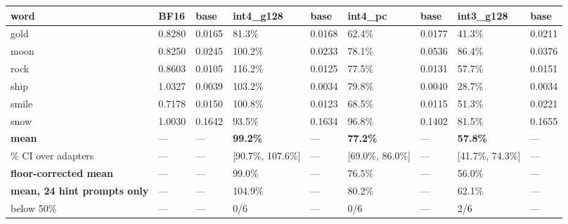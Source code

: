 \begin{table}[t]
\centering\footnotesize
\begin{tabularx}{\textwidth}{>{\hsize=1.000\hsize\raggedright\arraybackslash}Xllllllll}
\toprule
word & BF16 & base & int4\_g128 & base & int4\_pc & base & int3\_g128 & base \\
\midrule
gold & 0.8280 & 0.0165 & 81.3\% & 0.0168 & 62.4\% & 0.0177 & 41.3\% & 0.0211 \\
moon & 0.8250 & 0.0245 & 100.2\% & 0.0233 & 78.1\% & 0.0536 & 86.4\% & 0.0376 \\
rock & 0.8603 & 0.0105 & 116.2\% & 0.0125 & 77.5\% & 0.0131 & 57.7\% & 0.0151 \\
ship & 1.0327 & 0.0039 & 103.2\% & 0.0034 & 79.8\% & 0.0040 & 28.7\% & 0.0034 \\
smile & 0.7178 & 0.0150 & 100.8\% & 0.0123 & 68.5\% & 0.0115 & 51.3\% & 0.0221 \\
snow & 1.0030 & 0.1642 & 93.5\% & 0.1634 & 96.8\% & 0.1402 & 81.5\% & 0.1655 \\
\textbf{mean} & --- & --- & \textbf{99.2\%} & --- & \textbf{77.2\%} & --- & \textbf{57.8\%} & --- \\
95\% CI over adapters & --- & --- & [90.7\%, 107.6\%] & --- & [69.0\%, 86.0\%] & --- & [41.7\%, 74.3\%] & --- \\
\textbf{floor-corrected mean} & --- & --- & 99.0\% & --- & 76.5\% & --- & 56.0\% & --- \\
\textbf{mean, 24 hint prompts only} & --- & --- & 104.9\% & --- & 80.2\% & --- & 62.1\% & --- \\
below 50\% & --- & --- & 0/6 & --- & 0/6 & --- & 2/6 & --- \\
\bottomrule
\end{tabularx}
\end{table}

